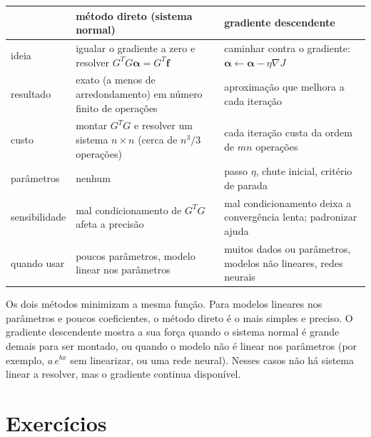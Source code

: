 \begin{center}
\small
\begin{tabular}{p{3.2cm}p{5.2cm}p{5.2cm}}
\toprule
 & método direto (sistema normal) & gradiente descendente\\
\midrule
ideia & igualar o gradiente a zero e resolver $G^TG\boldsymbol\alpha=G^T\mathbf f$ & caminhar contra o gradiente: $\boldsymbol\alpha\leftarrow\boldsymbol\alpha-\eta\nabla J$\\
resultado & exato (a menos de arredondamento) em número finito de operações & aproximação que melhora a cada iteração\\
custo & montar $G^TG$ e resolver um sistema $n\times n$ (cerca de $n^3/3$ operações) & cada iteração custa da ordem de $mn$ operações\\
parâmetros & nenhum & passo $\eta$, chute inicial, critério de parada\\
sensibilidade & mal condicionamento de $G^TG$ afeta a precisão & mal condicionamento deixa a convergência lenta; padronizar ajuda\\
quando usar & poucos parâmetros, modelo linear nos parâmetros & muitos dados ou parâmetros, modelos não lineares, redes neurais\\
\bottomrule
\end{tabular}
\end{center}

\begin{observacao}
Os dois métodos minimizam a mesma função. Para modelos lineares nos parâmetros e poucos coeficientes, o método
direto é o mais simples e preciso. O gradiente descendente mostra a sua força quando o sistema normal é grande
demais para ser montado, ou quando o modelo não é linear nos parâmetros (por exemplo, $a\,e^{bx}$ sem
linearizar, ou uma rede neural). Nesses casos não há sistema linear a resolver, mas o gradiente continua
disponível.
\end{observacao}

\section{Exercícios}

